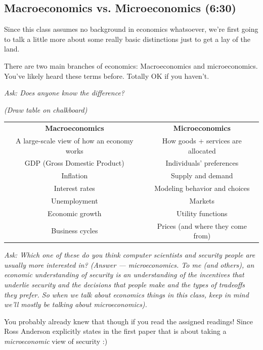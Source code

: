 \documentclass[11pt]{article}
\begin{document}
\subsection{Macroeconomics vs. Microeconomics (6:30)}

Since this class assumes no background in economics whatsoever, we're first going to talk a little more about some really basic distinctions just to get a lay of the land. 

There are two main branches of economics: Macroeconomics and microeconomics. You've likely heard these terms before. Totally OK if you haven't.

{\it Ask: Does anyone know the difference?}

{\it (Draw table on chalkboard)}

\begin{table}[H]
    \centering
    \begin{tabular}{c|c}
        \hline
        {\bf Macroeconomics} & {\bf Microeconomics} \\
        A large-scale view of how an economy works & How goods + services are allocated   \\ 
        \hline
        GDP (Gross Domestic Product) & Individuals' preferences \\
        Inflation & Supply and demand\\
        Interest rates & Modeling behavior and choices\\
        Unemployment & Markets \\ 
        Economic growth & Utility functions \\ 
        Business cycles & Prices (and where they come from)\\ 

        \hline
    \end{tabular}
\end{table}
        
{\it Ask: Which one of these do you think computer scientists and security people are usually more interested in? (Answer --- microeconomics. To me (and others), an economic understanding of security is an understanding of the incentives that underlie security and the decisions that people make and the types of tradeoffs they prefer. So when we talk about economics things in this class, keep in mind we'll mostly be talking about microeconomics).}

You probably already knew that though if you read the assigned readings! Since Ross Anderson explicitly states in the first paper that is about taking a {\it microeconomic} view of security :) 
\end{document}

